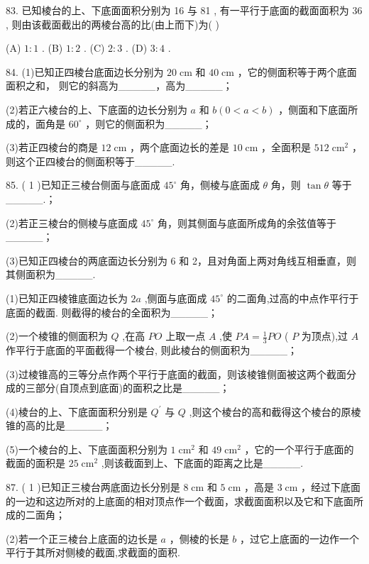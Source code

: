 \documentclass[10pt]{article}
\begin{document}
83. 已知棱台的上、下底面面积分别为 16 与 81 , 有一平行于底面的截面面积为 36 , 则由该截面截出的两棱台高的比(由上而下)为( )

(A) \(1 : 1\) . (B) \(1 : 2\) . (C) \(2 : 3\) . (D) \(3 : 4\) .

84. (1)已知正四棱台底面边长分别为 \({20}\mathrm{\;{cm}}\) 和 \({40}\mathrm{\;{cm}}\) ，它的侧面积等于两个底面面积之和， 则它的斜高为\_\_\_\_\_，高为\_\_\_\_\_；

(2)若正六棱台的上、下底面的边长分别为 \(a\) 和 \(b\left( {0 < a < b}\right)\) ，侧面和下底面所成的，面角是 \({60}^{ \circ  }\) ，则它的侧面积为\_\_\_\_\_；

(3)若正四棱台的商是 \({12}\mathrm{\;{cm}}\) ，两个底面边长的差是 \({10}\mathrm{\;{cm}}\) ，全面积是 \({512}{\mathrm{\;{cm}}}^{2}\) ，则这个正四棱台的侧面积等于\_\_\_\_\_.

85. ( 1 )已知正三棱台侧面与底面成 \({45}^{ \circ  }\) 角，侧棱与底面成 \(\theta\) 角，则 \(\tan \theta\) 等于\_\_\_\_\_.；

(2)若正三棱台的侧棱与底面成 \({45}^{ \circ  }\) 角，则其侧面与底面所成角的余弦值等于\_\_\_\_\_；

(3)已知正四棱台的两底面边长分别为 6 和 2，且对角面上两对角线互相垂直，则其侧面积为\_\_\_\_\_.

(1)已知正四棱锥底面边长为 \({2a}\) ,侧面与底面成 \({45}^{ \circ  }\) 的二面角,过高的中点作平行于底面的截面. 则截得的棱台的全面积为\_\_\_\_\_；

(2)一个棱锥的侧面积为 \(Q\) ,在高 \({PO}\) 上取一点 \(A\) ,使 \({PA} = \frac{1}{3}{PO}\) ( \(P\) 为顶点),过 \(A\) 作平行于底面的平面截得一个棱台, 则此棱台的侧面积为\_\_\_\_\_；

(3)过棱锥高的三等分点作两个平行于底面的截面，则该棱锥侧面被这两个截面分成的三部分(自顶点到底面)的面积之比是\_\_\_\_\_；

(4)棱台的上、下底面面积分别是 \({Q}^{\prime }\) 与 \(Q\) ,则这个棱台的高和截得这个棱台的原棱锥的高的比是\_\_\_\_\_；

(5)一个棱台的上、下底面面积分别为 \(1{\mathrm{\;{cm}}}^{2}\) 和 \({49}{\mathrm{\;{cm}}}^{2}\) ，它的一个平行于底面的截面的面积是 \({25}{\mathrm{\;{cm}}}^{2}\) ,则该截面到上、下底面的距离之比是\_\_\_\_\_.

87. ( 1 )已知正三棱台两底面边长分别是 \(8\mathrm{\;{cm}}\) 和 \(5\mathrm{\;{cm}}\) ，高是 \(3\mathrm{\;{cm}}\) ，经过下底面的一边和这边所对的上底面的相对顶点作一个截面，求截面面积以及它和下底面所成的二面角；

(2)若一个正三棱台上底面的边长是 \(a\) ，侧棱的长是 \(b\) ，过它上底面的一边作一个平行于其所对侧棱的截面,求截面的面积.
\end{document}
